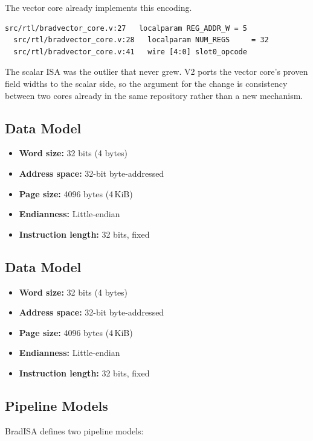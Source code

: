 \documentclass[11pt,a4paper]{article}
\begin{document}
The vector core already implements this encoding.

\begin{lstlisting}[style=Cstyle]
  src/rtl/bradvector_core.v:27   localparam REG_ADDR_W = 5
  src/rtl/bradvector_core.v:28   localparam NUM_REGS     = 32
  src/rtl/bradvector_core.v:41   wire [4:0] slot0_opcode
\end{lstlisting}

The scalar ISA was the outlier that never grew. V2 ports the vector core's
proven field widths to the scalar side, so the argument for the change is
consistency between two cores already in the same repository rather than a new
mechanism.

\subsection{Data Model}
\begin{itemize}[nosep]
  \item \textbf{Word size:} 32 bits (4 bytes)
  \item \textbf{Address space:} 32-bit byte-addressed
  \item \textbf{Page size:} 4096 bytes (4\,KiB)
  \item \textbf{Endianness:} Little-endian
  \item \textbf{Instruction length:} 32 bits, fixed
\end{itemize}

\subsection{Data Model}
\begin{itemize}[nosep]
  \item \textbf{Word size:} 32 bits (4 bytes)
  \item \textbf{Address space:} 32-bit byte-addressed
  \item \textbf{Page size:} 4096 bytes (4\,KiB)
  \item \textbf{Endianness:} Little-endian
  \item \textbf{Instruction length:} 32 bits, fixed
\end{itemize}

\subsection{Pipeline Models}
BradISA defines two pipeline models:
\end{document}
